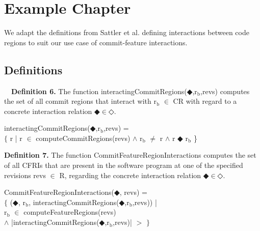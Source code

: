 
\section*{Example Chapter}\label{ch:example_chapter}

We adapt the definitions from Sattler et al. defining interactions between code regions to suit our use case of commit-feature interactions.

\subsection*{Definitions}\label{ch:definitions}

\ \ \textbf{Definition 6.} The function interactingCommitRegions($\mdlgblkdiamond$,$\text{r}_\text{b}$,revs) 
computes the set of all commit regions that interact with $\text{r}_\text{b}$ $\in$ CR
with regard to a concrete interaction relation $\mdlgblkdiamond \in \mdlgwhtdiamond$.
\begin{center} interactingCommitRegions($\mdlgblkdiamond$,$\text{r}_\text{b}$,revs) = \\ 
$\{$ r | r $\in$ computeCommitRegions(revs) $\land$ $\text{r}_\text{b}$ $\neq$ r $\land$ r $\mdlgblkdiamond$ $\text{r}_\text{b}$ \}
\end{center}

\textbf{Definition 7.} The function CommitFeatureRegionInteractions computes the set of all CFRIs that are present in the software program at
one of the specified revisions revs $\in$ R, regarding the concrete interaction relation $\mdlgblkdiamond \in \mdlgwhtdiamond$.
\begin{center}
CommitFeatureRegionInteractions($\mdlgblkdiamond$, revs) = \\
$\{$ ($\mdlgblkdiamond$, $\text{r}_\text{b}$, interactingCommitRegions($\mdlgblkdiamond$,$\text{r}_\text{b}$,revs)) | \\
$\text{r}_\text{b}$ $\in$ computeFeatureRegions(revs) \\
$\land$ |interactingCommitRegions($\mdlgblkdiamond$,$\text{r}_\text{b}$,revs)| $>$  $\}$
\end{center}

